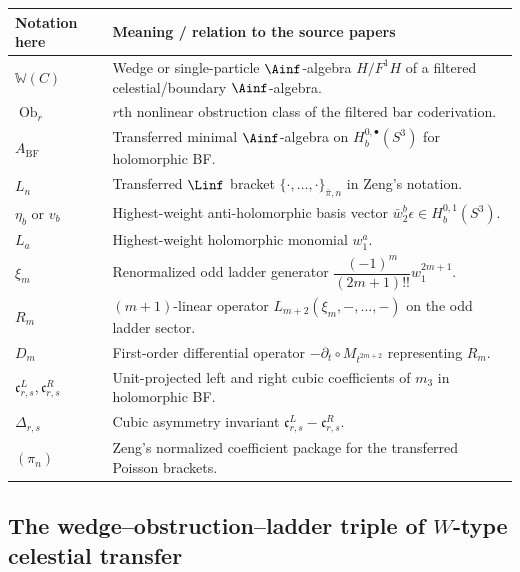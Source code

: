 \begin{longtable}{>{\raggedright\arraybackslash}p{}>{\raggedright\arraybackslash}p{}}
\toprule
\textbf{Notation here} & \textbf{Meaning / relation to the source papers}\\
\midrule
$\mathbb{W}(C)$ & Wedge or single-particle $\Ainf$-algebra $H/F^1H$ of a filtered celestial/boundary $\Ainf$-algebra.\\
$\operatorname{Ob}_r$ & $r$th nonlinear obstruction class of the filtered bar coderivation.\\
$A_{\mathrm{BF}}$ & Transferred minimal $\Ainf$-algebra on $H_b^{0,\bullet}(S^3)$ for holomorphic BF.\\
$L_n$ & Transferred $\Linf$ bracket $\{\cdot,\dots,\cdot\}_{\bar\pi,n}$ in Zeng's notation.\\
$\eta_b$ or $v_b$ & Highest-weight anti-holomorphic basis vector $\bar w_2^b\epsilon \in H_b^{0,1}(S^3)$.\\
$L_a$ & Highest-weight holomorphic monomial $w_1^a$.\\
$\xi_m$ & Renormalized odd ladder generator $\dfrac{(-1)^m}{(2m+1)!!}w_1^{2m+1}$.\\
$R_m$ & $(m+1)$-linear operator $L_{m+2}(\xi_m,-,\dots,-)$ on the odd ladder sector.\\
$D_m$ & First-order differential operator $-\partial_t\circ M_{t^{2m+2}}$ representing $R_m$.\\
$\mathfrak c^L_{r,s},\mathfrak c^R_{r,s}$ & Unit-projected left and right cubic coefficients of $m_3$ in holomorphic BF.\\
$\Delta_{r,s}$ & Cubic asymmetry invariant $\mathfrak c^L_{r,s}-\mathfrak c^R_{r,s}$.\\
$(\pi_n)$ & Zeng's normalized coefficient package for the transferred Poisson brackets.\\
\bottomrule
\end{longtable}

\subsection{The wedge--obstruction--ladder triple of $W$-type celestial transfer}
\label{sec:cbt-inventory}

